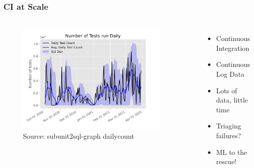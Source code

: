 \documentclass[aspectratio=169,11pt,hyperref={colorlinks=true}]{beamer}
\begin{document}
\begin{frame}
  \frametitle{CI at Scale}
  \begin{columns}
      \begin{figure}
      \begin{center}
        \includegraphics[width=0.9\textwidth]{graphs/daily_count.png}
           \caption{Source: subunit2sql-graph dailycount}
      \end{center}
      \end{figure}
      \begin{itemize}
          \item{Continuous Integration}
          \item{Continuous Log Data}
          \item{Lots of data, little time}
          \item{Triaging failures?}
          \item{ML to the rescue!}
      \end{itemize}
  \end{columns}
\end{frame}
\end{document}
